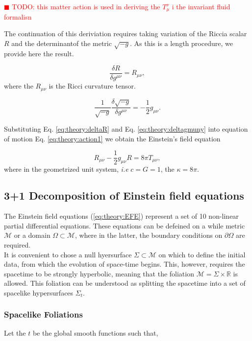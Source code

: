 \documentclass[11pt,a4paper,headinclude=true,DIV=14,BCOR=8mm,chapterprefix,listof=totoc,twoside,openright,abstracton]{scrbook}
\newcommand{\todo}[1]{\textcolor{red}{$\blacksquare$ TODO: #1}}
\begin{document}
\todo{this matter action is used in deriving the $T_{\mu} ^{\nu}$ i the invariant fluid formalisn}

The continuation of this deriviation requires taking variation of the Riccia scalar $R$ and the determinantof the metric $\sqrt{-g}$. As this is a length procedure, we provide here the result. 

\begin{equation}
    \frac{\delta R}{\delta g^{\mu\nu}} = R_{\mu\nu},
    \label{eq:theory:deltaR}
\end{equation}
where the $R_{\mu\nu}$ is the Ricci curvature tensor.

\begin{equation}
    \frac{1}{\sqrt{-g}}\frac{\delta\sqrt{-g}}{\delta g^{\mu\nu}} = -\frac{1}{2}g_{\mu\nu}.
    \label{eq:theory:deltagmuny}
\end{equation}

Substituting Eq. \ref{eq:theory:deltaR} and Eq. \ref{eq:theory:deltagmuny} into equation of motion Eq.  \ref{eq:theory:action1} we obtain the Einstein's field equation 

\begin{equation}
    R_{\mu\nu} -\frac{1}{2}g_{\mu\nu}R=8\pi T_{\mu\nu},
    \label{eq:theory:EFE}
\end{equation}
where in the geometrized unit system, \textit{i.e} $c=G=1$, the $\kappa=8\pi$.

\subsection{3+1 Decomposition of Einstein field equations}

The Einstein field equations (\ref{eq:theory:EFE}) represent a set of 10 non-linear partial differential equations. These equations can be defeined on a while metric $\mathcal{M}$ or a domain $\Omega\subset\mathcal{M}$, where in the latter, the boundary conditions on $\partial\Omega$ are required. \\
It is convenient to chose a null hyersurface $\Sigma\subset\mathcal{M}$ on which to define the initial data, from which the evolution of space-time begins. This, however, requires the spacetime to be strongly hyperbolic, meaning that the foliation $\mathcal{M}=\Sigma\times\mathbb{R}$ is allowed. This foliation can be understood as splitting the spacetime into a set of spacelike hypersurfaces $\Sigma_t$. 


\subsubsection{Spacelike Foliations}
Let the $t$ be the global smooth functions such that, 
\end{document}
